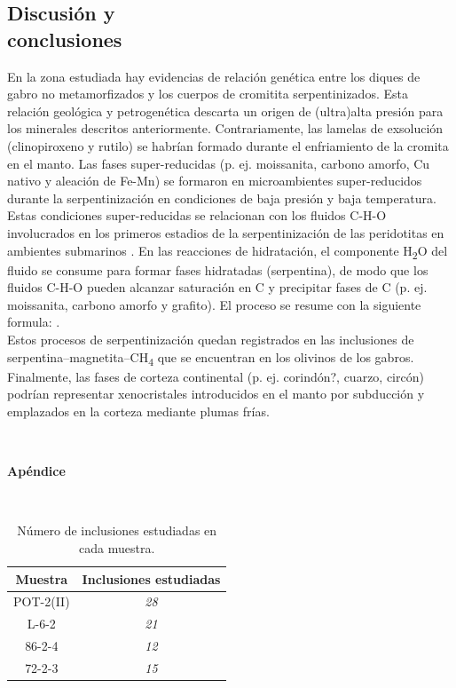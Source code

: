 \documentclass[a4paper,11pt]{article}
\begin{document}
	\begin{multicols}{2}	
		\section{Discusión y \\conclusiones}
		En la zona estudiada hay evidencias de relación genética entre los diques de gabro no metamorfizados y los cuerpos de cromitita serpentinizados. Esta relación geológica y petrogenética descarta un origen de (ultra)alta presión para los minerales descritos anteriormente. Contrariamente, las lamelas de exsolución (clinopiroxeno y rutilo) se habrían formado durante el enfriamiento de la cromita en el manto. Las fases super-reducidas (p. ej. moissanita, carbono amorfo, Cu nativo y aleación de Fe-Mn) se formaron en microambientes super-reducidos durante la serpentinización en condiciones de baja presión y baja temperatura. Estas condiciones super-reducidas se relacionan con los fluidos C-H-O involucrados en los primeros estadios de la serpentinización de las peridotitas en ambientes submarinos \cite{Golubkova}. En las reacciones de hidratación, el componente H\textsubscript{2}O del fluido se consume para formar fases hidratadas (serpentina), de modo que los fluidos C-H-O pueden alcanzar saturación en C y precipitar fases de C (p. ej. moissanita, carbono amorfo y grafito). El proceso se resume con la siguiente formula:
		 \cite{Golubkova}.
		\\Estos procesos de serpentinización quedan registrados en las inclusiones de serpentina–magnetita–CH\textsubscript{4} que se encuentran en los olivinos de los gabros. Finalmente, las fases de corteza continental (p. ej. corindón?, cuarzo, circón) podrían representar xenocristales introducidos en el manto por subducción y emplazados en la corteza mediante plumas frías.
\end{multicols}
		
	
	
	 \\
	\begin{appendices}
		\begin{large}
			\bf Apéndice
		\end{large}\\
			\begin{table}[h]
				\caption{Número de inclusiones estudiadas en cada muestra.}
			\begin{tabular}{|c|c|}
				\hline \bf Muestra & \bf Inclusiones estudiadas \\
				\hline
				POT-2(II) & \rm \em 28 \\
				\hline
				L-6-2 & \rm \em 21 \\
				\hline
				86-2-4 & \rm \em 12 \\
				\hline			
				72-2-3 & \rm \em 15 \\
				\hline
			\end{tabular}
				\label{Tabla1}
			\end{table}		
	\end{appendices}
\end{document}
